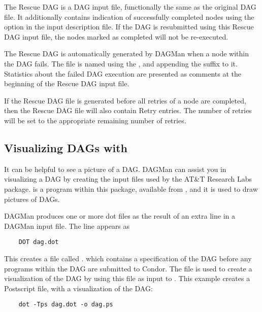The Rescue DAG is a DAG input file,
functionally the same as the original DAG file.
It additionally contains indication of
successfully completed nodes using the 
option in the input description file.
If the DAG is resubmitted using this Rescue DAG input file,
the nodes marked as completed will not be re-executed.

The Rescue DAG is automatically generated by DAGMan when a node
within the DAG fails.
The file is named using the , and appending
the suffix  to it.
Statistics about the failed DAG execution are presented as
comments at the beginning of the Rescue DAG input file.

If the Rescue DAG file is generated before all retries
of a node are completed, 
then the Rescue DAG file will also contain Retry entries.
The number of retries will be set to the appropriate remaining
number of retries. 

\subsection{Visualizing DAGs with }

It can be helpful to see a picture of a DAG.
DAGMan can assist you in visualizing a DAG by creating
the input files used by the AT\&T Research Labs 
 package. 
 is a program within this package,
available from ,
and it is used to draw pictures of DAGs. 

DAGMan produces one or more dot files as the result of
an extra line
in a DAGMan input file. 
The line appears as
\begin{verbatim}
	DOT dag.dot
\end{verbatim}

This creates a file called .
which contains
a specification of the DAG before any programs within the DAG
are submitted to Condor.
The  file is used to create a visualization
of the DAG by using this file as input to .
This example creates a Postscript file, with a visualization of the DAG:

\begin{verbatim}
    dot -Tps dag.dot -o dag.ps
\end{verbatim}

